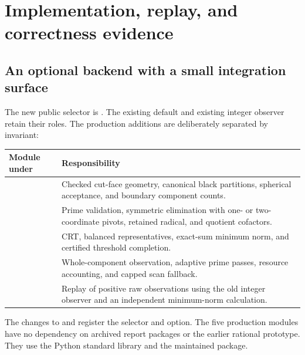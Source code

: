 \section{Implementation, replay, and correctness evidence}
\label{sec:implementation}

\subsection{An optional backend with a small integration surface}

The new public selector is . The existing
 default and existing  integer observer retain
their roles. The production additions are deliberately separated by invariant:

\begin{center}
\begin{tabularx}{\textwidth}{@{}P{0.36\textwidth}X@{}}
\toprule
Module under  & Responsibility\\
\midrule
{} & Checked cut-face geometry, canonical black partitions,
spherical acceptance, and boundary component counts.\\
 & Prime validation, symmetric elimination with one-
or two-coordinate pivots, retained radical, and quotient cofactors.\\
 & CRT, balanced representatives, exact-sum minimum
norm, and certified threshold completion.\\
 & Whole-component observation, adaptive prime passes,
resource accounting, and capped scan fallback.\\
 & Replay of positive raw observations using the old
integer observer and an independent minimum-norm calculation.\\
\bottomrule
\end{tabularx}
\end{center}

The changes to  and  register the selector
and  option. The five production modules have no dependency
on archived report packages or the earlier rational prototype. They use the
Python standard library and the maintained package.

